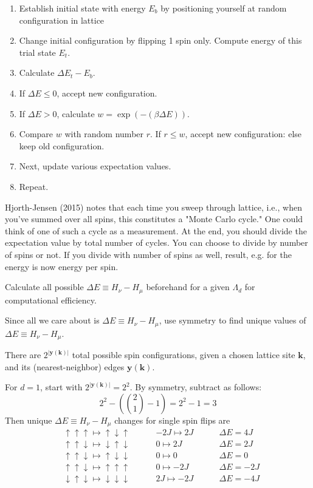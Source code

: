 \documentclass[10pt]{amsart}
\begin{document}
\begin{multicols*}{2}
\begin{enumerate}
	\item Establish initial state with energy $E_b$ by positioning yourself at random configuration in lattice
	\item Change initial configuration by flipping 1 spin only.  Compute energy of this trial state $E_t$.  
	\item Calculate $\Delta E_t - E_b$.  
	\item If $\Delta E \leq 0$, accept new configuration.  
	\item If $\Delta E >0$, calculate $w=\exp{ (- (\beta \Delta E))}$.  
	\item Compare $w$ with random number $r$.  If $r\leq w$, accept new configuration: else keep old configuration.  
	\item Next, update various expectation values.  
	\item Repeat.  
\end{enumerate}

Hjorth-Jensen (2015) \cite{Hjor2015} notes that each time you sweep through lattice, i.e., when you've summed over all spins, this constitutes a "Monte Carlo cycle."  One could think of one of such a cycle as a measurement.  At the end, you should divide the expectation value by total number of cycles.  You can choose to divide by number of spins or not.  If you divide with number of spins as well, result, e.g. for the energy is now energy per spin.  

Calculate all possible $\Delta E \equiv H_{\nu} - H_{\mu}$ beforehand for a given $\Lambda_d$ for computational efficiency.  

Since all we care about is $\Delta E \equiv H_{\nu} - H_{\mu}$, use symmetry to find unique values of $\Delta E \equiv H_{\nu} - H_{\mu}$.  

There are $2^{ |\mathbf{y}(\mathbf{k}) | } $ total possible spin configurations, given a chosen lattice site $\mathbf{k}$, and its (nearest-neighbor) edges $\mathbf{y}(\mathbf{k})$.  

For $d=1$, start with $2^{ |\mathbf{y}(\mathbf{k}) | } = 2^2$.  By symmetry, subtract as follows: 
\[
2^2 - \left( \binom{2}{1} - 1 \right) = 2^2-1=3
\]
Then unique $\Delta E \equiv H_{\nu} - H_{\mu}$ changes for single spin flips are
\[
\begin{aligned}
& \uparrow \uparrow \uparrow \mapsto \uparrow \downarrow \uparrow \qquad \  & -2J \mapsto 2J \qquad \  & \Delta E = 4J \\
& \uparrow \uparrow \downarrow \mapsto \downarrow \uparrow \downarrow \qquad \  & 0 \mapsto 2J  \qquad \  & \Delta E = 2J \\ 
& \uparrow \uparrow \downarrow \mapsto \uparrow \downarrow \downarrow \qquad \  & 0 \mapsto 0 \qquad \  & \Delta E = 0 \\ 
& \uparrow \uparrow \downarrow \mapsto \uparrow \uparrow \uparrow \qquad \  & 0 \mapsto -2J \qquad \  & \Delta E = -2J \\
& \downarrow \uparrow \downarrow \mapsto \downarrow \downarrow \downarrow \qquad \  & 2J \mapsto -2J \qquad \  & \Delta E = -4J 
\end{aligned}
\]


\end{multicols*}
\end{document}
